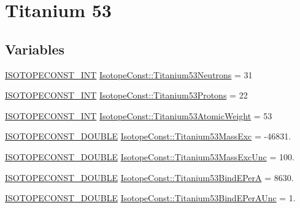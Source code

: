 \hypertarget{group___isotope_const-_titanium-_ti53}{}\section{Titanium 53}
\label{group___isotope_const-_titanium-_ti53}
\subsection*{Variables}
\begin{DoxyCompactItemize}
\item 
\mbox{\hyperlink{group___isotope_const-_macros_ga5f18360b3e99483a35c32d789e62621c}{I\+S\+O\+T\+O\+P\+E\+C\+O\+N\+S\+T\+\_\+\+I\+NT}} \mbox{\hyperlink{group___isotope_const-_titanium-_ti53_ga8e8e9060703c6ea9388c35664559f779}{Isotope\+Const\+::\+Titanium53\+Neutrons}} = 31
\item 
\mbox{\hyperlink{group___isotope_const-_macros_ga5f18360b3e99483a35c32d789e62621c}{I\+S\+O\+T\+O\+P\+E\+C\+O\+N\+S\+T\+\_\+\+I\+NT}} \mbox{\hyperlink{group___isotope_const-_titanium-_ti53_gaf63fc5dec3588dffde6369cdca8190b1}{Isotope\+Const\+::\+Titanium53\+Protons}} = 22
\item 
\mbox{\hyperlink{group___isotope_const-_macros_ga5f18360b3e99483a35c32d789e62621c}{I\+S\+O\+T\+O\+P\+E\+C\+O\+N\+S\+T\+\_\+\+I\+NT}} \mbox{\hyperlink{group___isotope_const-_titanium-_ti53_ga2d3d6d7e4227c93fa7906b41199d2a30}{Isotope\+Const\+::\+Titanium53\+Atomic\+Weight}} = 53
\item 
\mbox{\hyperlink{group___isotope_const-_macros_ga8f45a7272ce02c0b4c65c44636ed719a}{I\+S\+O\+T\+O\+P\+E\+C\+O\+N\+S\+T\+\_\+\+D\+O\+U\+B\+LE}} \mbox{\hyperlink{group___isotope_const-_titanium-_ti53_ga41c33cd9260627634d7df67982c9730e}{Isotope\+Const\+::\+Titanium53\+Mass\+Exc}} = -\/46831.
\item 
\mbox{\hyperlink{group___isotope_const-_macros_ga8f45a7272ce02c0b4c65c44636ed719a}{I\+S\+O\+T\+O\+P\+E\+C\+O\+N\+S\+T\+\_\+\+D\+O\+U\+B\+LE}} \mbox{\hyperlink{group___isotope_const-_titanium-_ti53_gacd0d9cc3f68409fd895437fcf9df37c7}{Isotope\+Const\+::\+Titanium53\+Mass\+Exc\+Unc}} = 100.
\item 
\mbox{\hyperlink{group___isotope_const-_macros_ga8f45a7272ce02c0b4c65c44636ed719a}{I\+S\+O\+T\+O\+P\+E\+C\+O\+N\+S\+T\+\_\+\+D\+O\+U\+B\+LE}} \mbox{\hyperlink{group___isotope_const-_titanium-_ti53_ga51b367cb11b99670f51187e74207b041}{Isotope\+Const\+::\+Titanium53\+Bind\+E\+PerA}} = 8630.
\item 
\mbox{\hyperlink{group___isotope_const-_macros_ga8f45a7272ce02c0b4c65c44636ed719a}{I\+S\+O\+T\+O\+P\+E\+C\+O\+N\+S\+T\+\_\+\+D\+O\+U\+B\+LE}} \mbox{\hyperlink{group___isotope_const-_titanium-_ti53_ga28edb917e09a466864cf88309ebec91d}{Isotope\+Const\+::\+Titanium53\+Bind\+E\+Per\+A\+Unc}} = 1.

\end{DoxyCompactItemize}
